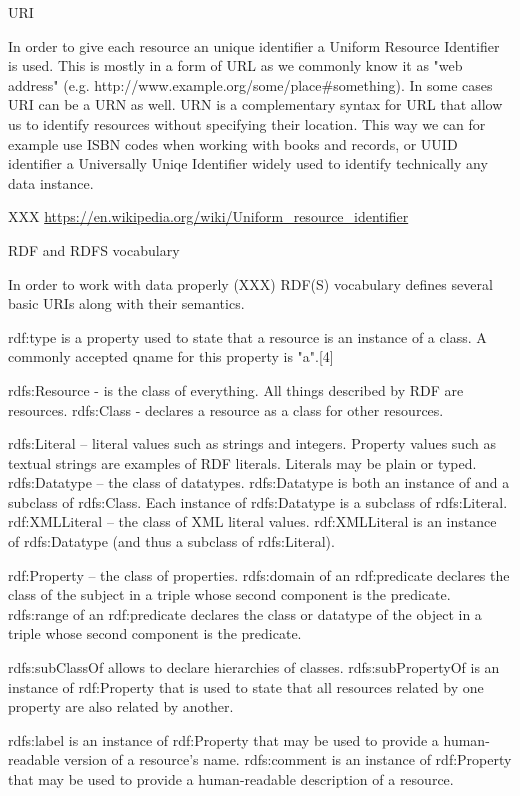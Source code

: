 \secc URI

In order to give each resource an unique identifier a Uniform Resource
Identifier is used. This is mostly in a form of URL as we commonly know it as
"web address" (e.g. http://www.example.org/some/place\#something). In some cases
URI can be a URN as well. URN is a complementary syntax for URL that allow us
to identify resources without specifying their location. This way we can for
example use ISBN codes when working with books and records, or UUID identifier
a Universally Uniqe Identifier widely used to identify technically any data
instance. 

XXX \url{https://en.wikipedia.org/wiki/Uniform_resource_identifier}

\secc RDF and RDFS vocabulary

In order to work with data properly (XXX) RDF(S) vocabulary defines several basic URIs along with their semantics. 

    rdf:type is a property used to state that a resource is an instance of a class. A commonly accepted qname for this property is "a".[4]

    rdfs:Resource - is the class of everything. All things described by RDF are resources.
    rdfs:Class    - declares a resource as a class for other resources.

    rdfs:Literal  – literal values such as strings and integers. Property values such as textual strings are examples of RDF literals. Literals may be plain or typed.
    rdfs:Datatype – the class of datatypes. rdfs:Datatype is both an instance of and a subclass of rdfs:Class. Each instance of rdfs:Datatype is a subclass of rdfs:Literal.
    rdf:XMLLiteral – the class of XML literal values. rdf:XMLLiteral is an instance of rdfs:Datatype (and thus a subclass of rdfs:Literal).

    rdf:Property – the class of properties.
    rdfs:domain of an rdf:predicate declares the class of the subject in a triple whose second component is the predicate.
    rdfs:range of an rdf:predicate declares the class or datatype of the object in a triple whose second component is the predicate.

    rdfs:subClassOf allows to declare hierarchies of classes.
    rdfs:subPropertyOf is an instance of rdf:Property that is used to state that all resources related by one property are also related by another.

    rdfs:label is an instance of rdf:Property that may be used to provide a human-readable version of a resource's name.
    rdfs:comment is an instance of rdf:Property that may be used to provide a human-readable description of a resource.

